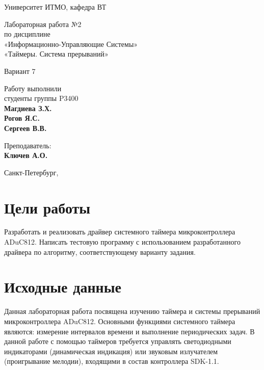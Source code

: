 \documentclass[a4paper,12pt]{article}
\begin{document}
\begin{titlepage}
\begin{center}
    Университет ИТМО, кафедра ВТ
    
    \large
    Лабораторная работа №2          \\
    по дисциплине \\
    «Информационно-Управляющие Системы» \\

    «Таймеры. Система прерываний»
   
    \normalsize
    Вариант 7

\end{center}

\begin{flushright}{
        \large 
        Работу выполнили                 \\
        студенты группы P3400    \\
        \textbf{
            Магдиева З.Х. \\
            Рогов Я.С.    \\
            Сергеев В.В.}       
        
        Преподаватель:          \\
        \textbf{Ключев А.О.}
}\end{flushright}

\begin{center}{
        Санкт-Петербург, \the\year
    }
\end{center}
\end{titlepage}

\section{Цели работы}
Разработать и реализовать драйвер системного таймера микроконтроллера ADuC812.
Написать тестовую программу с использованием разработанного драйвера по алгоритму,
соответствующему варианту задания.


\section{Исходные данные}
Данная лабораторная работа посвящена изучению таймера и системы прерываний
микроконтроллера ADuC812. Основными функциями системного таймера являются:
измерение интервалов времени и выполнение периодических задач. В данной работе с
помощью таймеров требуется управлять светодиодными индикаторами (динамическая
индикация) или звуковым излучателем (проигрывание мелодии), входящими в состав
контроллера SDK-1.1.
    
\end{document}
